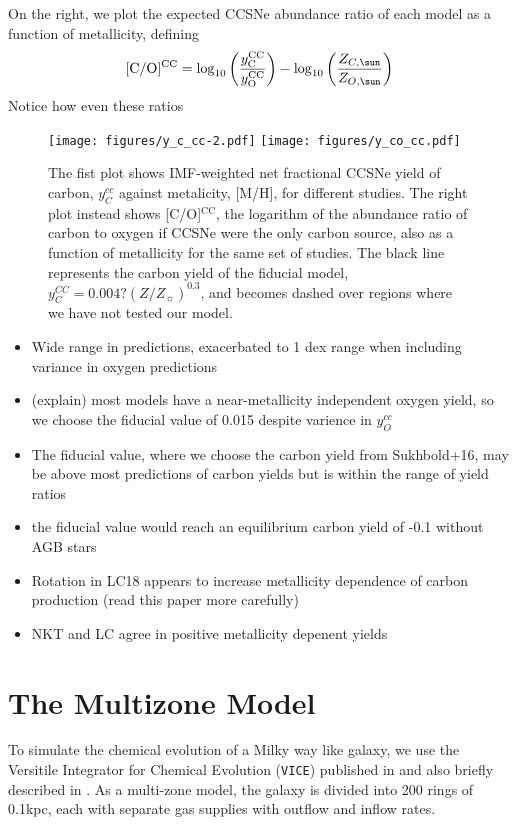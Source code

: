 \documentclass[fleqn,usenatbib]{mnras}
\newcommand{\VICE}{\texttt{VICE}}
\begin{document}
On the right, we plot the expected CCSNe abundance ratio of each model as a function of metallicity, defining
\begin{equation}
    {\rm [C/O]^{CC}} = \log_{10}\left( \frac{y_{\rm C}^{\rm CC}}{y_{\rm O}^{\rm CC}}\right) - \log_{10} \left( \frac{Z_{C, \sun }}{Z_{O, \sun }} \right)
\end{equation}
Notice how even these ratios 
\begin{figure*}
    \texttt{[image: figures/y\_c\_cc-2.pdf]}
    \texttt{[image: figures/y\_co\_cc.pdf]}
    \caption{The fist plot shows IMF-weighted net fractional CCSNe yield of carbon, $y_C^{cc}$ against metalicity, [M/H], for different studies. The right plot instead shows [C/O]$^\text{CC}$, the logarithm of the abundance ratio of carbon to oxygen if CCSNe were the only carbon source, also as a function of metallicity for the same set of studies. The black line represents the carbon yield of the fiducial model, $y_C^{CC} = 0.004? (Z/Z_{\sun})^{0.3}$, and becomes dashed over regions where we have not tested our model. }
    \label{fig:y_cc}
\end{figure*}

    \begin{itemize}
        \item Wide range in predictions, exacerbated to 1 dex range when including variance in oxygen predictions
        \item (explain) most models have a near-metallicity independent oxygen yield, so we choose the fiducial value of 0.015 despite varience in $y_O^{cc}$
        \item The fiducial value, where we choose the carbon yield from Sukhbold+16, may be above most predictions of carbon yields but is within the range of yield ratios
        \item the fiducial value would reach an equilibrium carbon yield of -0.1 without AGB stars
        \item Rotation in LC18 appears to increase metallicity dependence of carbon production (read this paper more carefully)
        \item NKT and LC agree in positive metallicity depenent yields
    \end{itemize}
    

\section{The Multizone Model}

To simulate the chemical evolution of a Milky way like galaxy, we use the Versitile Integrator for Chemical Evolution (\VICE ) published in \citet{2021MNRAS.508.4484J} and also briefly described in \citet{2022arXiv220204666J}. 
As a multi-zone model, the galaxy is divided into 200 rings of 0.1kpc, each with separate gas supplies with outflow and inflow rates.
\end{document}
